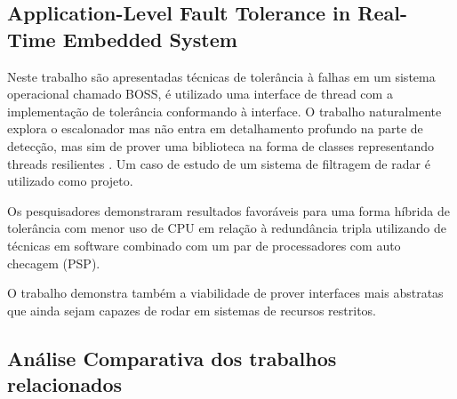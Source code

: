 \subsection{Application-Level Fault Tolerance in Real-Time Embedded System}

Neste trabalho são apresentadas técnicas de tolerância à falhas em um sistema operacional chamado BOSS, é utilizado uma interface de thread com a implementação de tolerância conformando à interface. O trabalho naturalmente explora o escalonador mas não entra em detalhamento profundo na parte de detecção, mas sim de prover uma biblioteca na forma de classes representando threads resilientes \cite{ApplicationLevelFT}. Um caso de estudo de um sistema de filtragem de radar é utilizado como projeto.

Os pesquisadores demonstraram resultados favoráveis para uma forma híbrida de tolerância com menor uso de CPU em relação à redundância tripla utilizando de técnicas em software combinado com um par de processadores com auto checagem (PSP).


O trabalho demonstra também a viabilidade de prover interfaces mais abstratas que ainda sejam capazes de rodar em sistemas de recursos restritos.

\subsection{Análise Comparativa dos trabalhos relacionados}



        
        
